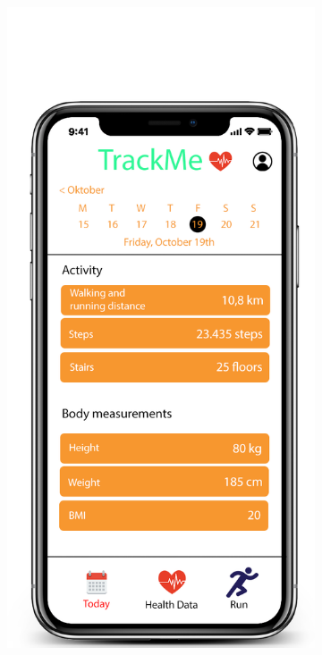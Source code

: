 \documentclass[12pt]{article}
\begin{document}
\begin{figure}[t!]
\centering
    \begin{subfigure}{.4\textwidth}
        \includegraphics[scale=0.2]{HomeScreen1.png}
        \label{fig:HomeScreen1}

\end{subfigure}
\end{figure}
\end{document}
